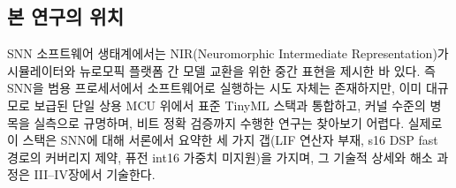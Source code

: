 \subsection{본 연구의 위치}

SNN 소프트웨어 생태계에서는 NIR(Neuromorphic Intermediate Representation)가 시뮬레이터와 뉴로모픽 플랫폼 간 모델 교환을 위한 중간 표현을 제시한 바 있다\cite{pedersen2024nir}. 즉 SNN을 범용 프로세서에서 소프트웨어로 실행하는 시도 자체는 존재하지만, 이미 대규모로 보급된 단일 상용 MCU 위에서 표준 TinyML 스택과 통합하고, 커널 수준의 병목을 실측으로 규명하며, 비트 정확 검증까지 수행한 연구는 찾아보기 어렵다. 실제로 이 스택은 SNN에 대해 서론에서 요약한 세 가지 갭(LIF 연산자 부재, s16 DSP fast 경로의 커버리지 제약, 퓨전 int16 가중치 미지원)을 가지며, 그 기술적 상세와 해소 과정은 III--IV장에서 기술한다.
